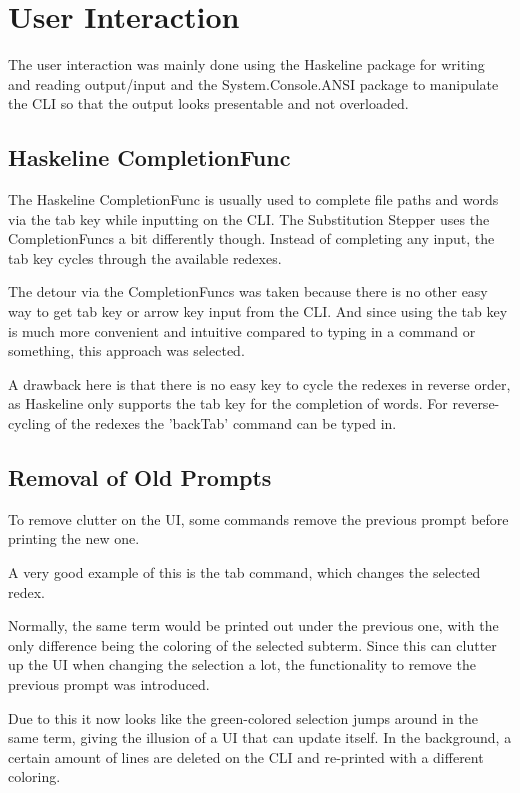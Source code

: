 \section{User Interaction}
The user interaction was mainly done using the Haskeline package for writing and reading output/input
and the System.Console.ANSI package to manipulate the CLI so that the output looks presentable and not overloaded.

\subsection{Haskeline CompletionFunc}
The Haskeline CompletionFunc is usually used to complete file paths and words via the tab key while inputting on the CLI.
The Substitution Stepper uses the CompletionFuncs a bit differently though.
Instead of completing any input,
the tab key cycles through the available redexes.

The detour via the CompletionFuncs was taken because there is no other easy way to get tab key or arrow key input from the CLI.
And since using the tab key is much more convenient and intuitive compared to typing in a command or something,
this approach was selected.

A drawback here is that there is no easy key to cycle the redexes in reverse order,
as Haskeline only supports the tab key for the completion of words.
For reverse-cycling of the redexes the 'backTab' command can be typed in.

\subsection{Removal of Old Prompts}
To remove clutter on the UI,
some commands remove the previous prompt before printing the new one.

A very good example of this is the tab command,
which changes the selected redex.

Normally,
the same term would be printed out under the previous one,
with the only difference being the coloring of the selected subterm.
Since this can clutter up the UI when changing the selection a lot,
the functionality to remove the previous prompt was introduced.

Due to this it now looks like the green-colored selection jumps around in the same term,
giving the illusion of a UI that can update itself.
In the background,
a certain amount of lines are deleted on the CLI and re-printed with a different coloring.

